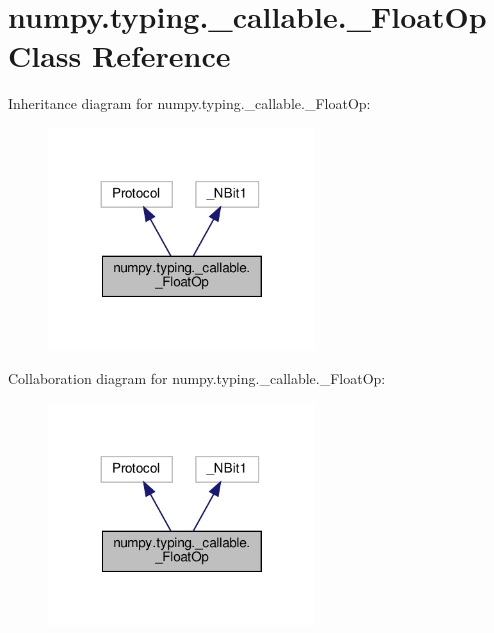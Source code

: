 \hypertarget{classnumpy_1_1typing_1_1__callable_1_1__FloatOp}{}\section{numpy.\+typing.\+\_\+callable.\+\_\+\+Float\+Op Class Reference}
\label{classnumpy_1_1typing_1_1__callable_1_1__FloatOp}


Inheritance diagram for numpy.\+typing.\+\_\+callable.\+\_\+\+Float\+Op\+:
\nopagebreak
\begin{figure}[H]
\begin{center}
\leavevmode
\includegraphics[width=200pt]{classnumpy_1_1typing_1_1__callable_1_1__FloatOp__inherit__graph}
\end{center}
\end{figure}


Collaboration diagram for numpy.\+typing.\+\_\+callable.\+\_\+\+Float\+Op\+:
\nopagebreak
\begin{figure}[H]
\begin{center}
\leavevmode
\includegraphics[width=200pt]{classnumpy_1_1typing_1_1__callable_1_1__FloatOp__coll__graph}
\end{center}
\end{figure}
